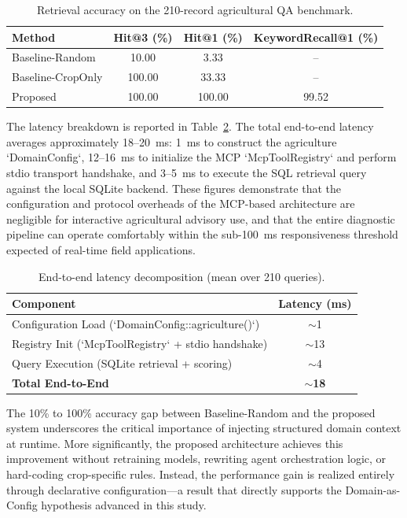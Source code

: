 \begin{table}[htbp]
\centering
\caption{Retrieval accuracy on the 210-record agricultural QA benchmark.}
\label{tab:retrieval_results}
\begin{tabular}{lccc}
\hline
\textbf{Method} & \textbf{Hit@3 (\%)} & \textbf{Hit@1 (\%)} & \textbf{KeywordRecall@1 (\%)} \\
\hline
Baseline-Random    & 10.00  & 3.33   & --     \\
Baseline-CropOnly  & 100.00 & 33.33  & --     \\
Proposed           & 100.00 & 100.00 & 99.52  \\
\hline
\end{tabular}
\end{table}

The latency breakdown is reported in Table~\ref{tab:latency_results}. The total end-to-end latency averages approximately 18--20~ms: 1~ms to construct the agriculture `DomainConfig`, 12--16~ms to initialize the MCP `McpToolRegistry` and perform stdio transport handshake, and 3--5~ms to execute the SQL retrieval query against the local SQLite backend. These figures demonstrate that the configuration and protocol overheads of the MCP-based architecture are negligible for interactive agricultural advisory use, and that the entire diagnostic pipeline can operate comfortably within the sub-100~ms responsiveness threshold expected of real-time field applications.

\begin{table}[htbp]
\centering
\caption{End-to-end latency decomposition (mean over 210 queries).}
\label{tab:latency_results}
\begin{tabular}{lc}
\hline
\textbf{Component} & \textbf{Latency (ms)} \\
\hline
Configuration Load (`DomainConfig::agriculture()`) & $\sim$1 \\
Registry Init (`McpToolRegistry` + stdio handshake) & $\sim$13 \\
Query Execution (SQLite retrieval + scoring)         & $\sim$4 \\
\hline
\textbf{Total End-to-End}                           & \textbf{$\sim$18} \\
\hline
\end{tabular}
\end{table}

The 10\% to 100\% accuracy gap between Baseline-Random and the proposed system underscores the critical importance of injecting structured domain context at runtime. More significantly, the proposed architecture achieves this improvement without retraining models, rewriting agent orchestration logic, or hard-coding crop-specific rules. Instead, the performance gain is realized entirely through declarative configuration---a result that directly supports the Domain-as-Config hypothesis advanced in this study.

